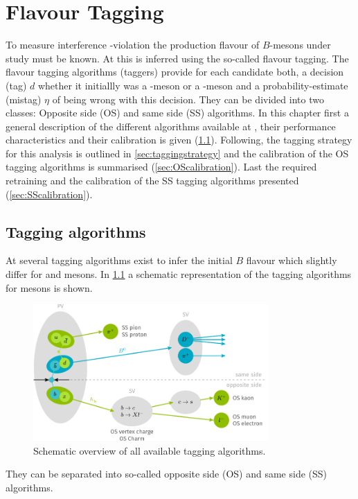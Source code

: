 \chapter{Flavour Tagging}
\label{ch:flavourtagging}

To measure interference \CP-violation the production flavour of $B$-mesons under study must be known.
At \lhcb this is inferred using the so-called flavour tagging.
The flavour tagging algorithms (taggers) provide for each candidate both, a decision (tag) $d$ whether it initiallly was a \Bz-meson or a \Bzb-meson and a probability-estimate (mistag) $\eta$ of being wrong with this decision.
They can be divided into two classes: Opposite side (OS) and same side (SS) algorithms.
In this chapter first a general description of the different algorithms available at \lhcb, their performance characteristics and their calibration is given (\cref{sec:taggingalgorithms}).
Following, the tagging strategy for this analysis is outlined in \cref{sec:taggingstrategy} and the calibration of the OS tagging algorithms is summarised (\cref{sec:OScalibration}).
Last the required retraining and the calibration of the SS tagging algorithms presented (\cref{sec:SScalibration}).

\section{Tagging algorithms}
\label{sec:taggingalgorithms}

At \lhcb several tagging algorithms exist to infer the initial $B$ flavour which slightly differ for \Bz and \Bs mesons.
In \cref{fig:taggingalgorithms} a schematic representation of the tagging algorithms for \Bz mesons is shown.
\begin{figure}[tbp]
    \centering
    \includegraphics[width=0.8\textwidth]{08FlavourTagging/figs/FTscheme.pdf}
    \caption{Schematic overview of all available \Bz tagging algorithms.}
    \label{fig:taggingalgorithms}
\end{figure}
They can be separated into so-called opposite side (OS) and same side (SS) algorithms.

